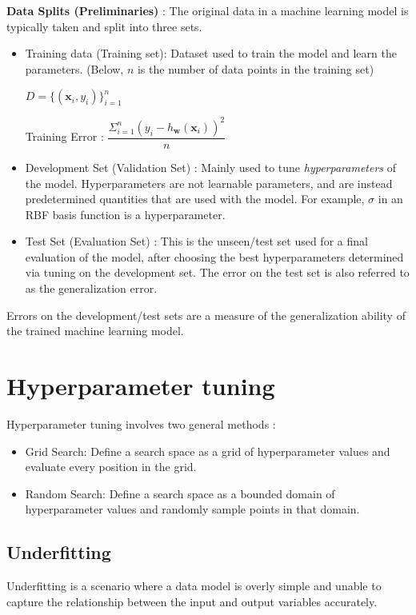 \documentclass{report}
\newcommand{\w}{\mathbf{w}} %
\newcommand{\x}{\mathbf{x}}
\begin{document}
\begin{mdframed}
  \textbf{Data Splits (Preliminaries)} :
  The original data in a machine learning model is typically taken and split into three sets.
  \begin{itemize}
    \item Training data (Training set): Dataset used to train the model and learn the parameters. (Below, $n$ is the number of data points in the training set)
          \begin{center}$D = \{(\x_i, y_i)\}_{i=1}^n$\end{center}
          \begin{center}Training Error : $\dfrac{\Sigma_{i=1}^n (y_i - h_\w(\x_i))^2}{n}$\end{center}
    \item Development Set (Validation Set) : Mainly used to tune \textit{hyperparameters} of the model. Hyperparameters are not learnable parameters, and are instead predetermined quantities that are used with the model. For example, $\sigma$ in an RBF basis function is a hyperparameter.
    \item Test Set (Evaluation Set) : This is the unseen/test set used for a final evaluation of the model, after choosing the best hyperparameters determined via tuning on the development set. The error on the test set is also referred to as the generalization error.
  \end{itemize}
  Errors on the development/test sets are a measure of the generalization ability of the trained machine learning model.
\end{mdframed}

\section{Hyperparameter tuning}

Hyperparameter tuning involves two general methods :
\begin{itemize}
  \item Grid Search: Define a search space as a grid of hyperparameter values and evaluate every position in the grid.
  \item Random Search: Define a search space as a bounded domain of hyperparameter values and randomly sample points in that domain.
\end{itemize}

\subsection{Underfitting}
Underfitting is a scenario where a data model is overly simple and unable to capture the relationship between the input and output variables accurately.
\end{document}

